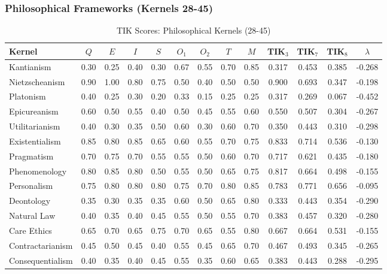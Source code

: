 \documentclass[11pt,a4paper]{article}
\theoremstyle{definition}
\theoremstyle{remark}
\begin{document}
\subsubsection{Philosophical Frameworks (Kernels 28-45)}

\begin{table}[H]
\centering
\caption{TIK Scores: Philosophical Kernels (28-45)}
\label{tab:tik-philosophical}
\small
\begin{tabular}{@{}l|ccccccc|c|cccc@{}}
\toprule
\textbf{Kernel} & $Q$ & $E$ & $I$ & $S$ & $O_1$ & $O_2$ & $T$ & $M$ & \textbf{TIK$_3$} & \textbf{TIK$_7$} & \textbf{TIK$_8$} & $\lambda$ \\
\midrule
Kantianism & 0.30 & 0.25 & 0.40 & 0.30 & 0.67 & 0.55 & 0.70 & 0.85 & 0.317 & 0.453 & 0.385 & -0.268 \\
Nietzscheanism & 0.90 & 1.00 & 0.80 & 0.75 & 0.50 & 0.40 & 0.50 & 0.50 & 0.900 & 0.693 & 0.347 & -0.198 \\
Platonism & 0.40 & 0.25 & 0.30 & 0.20 & 0.33 & 0.15 & 0.25 & 0.25 & 0.317 & 0.269 & 0.067 & -0.452 \\
Epicureanism & 0.60 & 0.50 & 0.55 & 0.40 & 0.50 & 0.45 & 0.55 & 0.60 & 0.550 & 0.507 & 0.304 & -0.267 \\
Utilitarianism & 0.40 & 0.30 & 0.35 & 0.50 & 0.60 & 0.30 & 0.60 & 0.70 & 0.350 & 0.443 & 0.310 & -0.298 \\
Existentialism & 0.85 & 0.80 & 0.85 & 0.65 & 0.60 & 0.55 & 0.70 & 0.75 & 0.833 & 0.714 & 0.536 & -0.130 \\
Pragmatism & 0.70 & 0.75 & 0.70 & 0.55 & 0.55 & 0.50 & 0.60 & 0.70 & 0.717 & 0.621 & 0.435 & -0.180 \\
Phenomenology & 0.80 & 0.85 & 0.80 & 0.50 & 0.55 & 0.50 & 0.65 & 0.75 & 0.817 & 0.664 & 0.498 & -0.155 \\
Personalism & 0.75 & 0.80 & 0.80 & 0.80 & 0.75 & 0.70 & 0.80 & 0.85 & 0.783 & 0.771 & 0.656 & -0.095 \\
Deontology & 0.35 & 0.30 & 0.35 & 0.35 & 0.60 & 0.50 & 0.65 & 0.80 & 0.333 & 0.443 & 0.354 & -0.290 \\
Natural Law & 0.40 & 0.35 & 0.40 & 0.45 & 0.55 & 0.50 & 0.55 & 0.70 & 0.383 & 0.457 & 0.320 & -0.280 \\
Care Ethics & 0.65 & 0.70 & 0.65 & 0.75 & 0.70 & 0.65 & 0.55 & 0.80 & 0.667 & 0.664 & 0.531 & -0.155 \\
Contractarianism & 0.45 & 0.50 & 0.45 & 0.40 & 0.55 & 0.45 & 0.65 & 0.70 & 0.467 & 0.493 & 0.345 & -0.265 \\
Consequentialism & 0.40 & 0.35 & 0.40 & 0.45 & 0.55 & 0.35 & 0.60 & 0.65 & 0.383 & 0.443 & 0.288 & -0.295 \\

\end{tabular}
\end{table}
\end{document}
